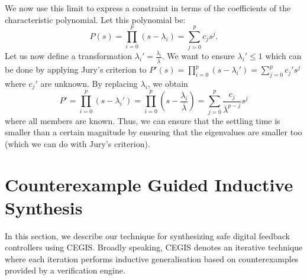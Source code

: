 \documentclass[sigconf]{llncs}
\begin{document}
%
We now use this limit to express a constraint in terms of the
coefficients of the characteristic polynomial.  Let this
polynomial be:
%
\begin{equation}
P(s)=\prod_{i=0}^p (s-\lambda_i)=\sum_{j=0}^p c_js^j.
\end{equation}
%
Let us now define a
transformation $\lambda_i'=\frac{\lambda_i}{\overline{\lambda}}$.  We want
to ensure $\lambda_i' \leq 1$ which can be done by applying Jury's criterion
to $P'(s)=\prod_{i=0}^p (s-\lambda_i')=\sum_{j=0}^p c_j's^j$ where $c_j'$ are
unknown.  By replacing $\lambda_i$, we obtain
%
\begin{equation}
P'=\prod_{i=0}^p (s-\lambda_i')=\prod_{i=0}^p \left(s-\frac{\lambda_i}{\overline{\lambda}}\right)=\sum_{j=0}^p \frac{c_j}{\overline{\lambda}^{p-j}}s^j
\end{equation}
%
where all members are known. Thus, we can ensure that the settling time is smaller than
a certain magnitude by ensuring that 
the eigenvalues are smaller too (which we can do with Jury's criterion).

\section{Counterexample Guided Inductive Synthesis} 
\label{ssec:cegis}

In this section, we describe our technique for synthesizing safe
digital feedback controllers using CEGIS. Broadly speaking, CEGIS
denotes an iterative technique where each iteration performs inductive
generalisation based on counterexamples provided by a verification
engine.


\end{document}
